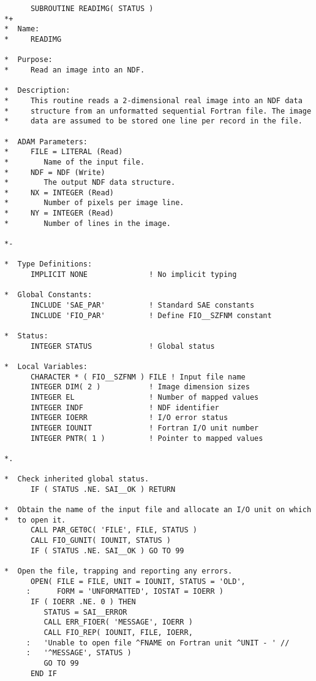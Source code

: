 \small
\begin{verbatim}
      SUBROUTINE READIMG( STATUS )
*+
*  Name:
*     READIMG

*  Purpose:
*     Read an image into an NDF.

*  Description:
*     This routine reads a 2-dimensional real image into an NDF data
*     structure from an unformatted sequential Fortran file. The image
*     data are assumed to be stored one line per record in the file.

*  ADAM Parameters:
*     FILE = LITERAL (Read)
*        Name of the input file.
*     NDF = NDF (Write)
*        The output NDF data structure.
*     NX = INTEGER (Read)
*        Number of pixels per image line.
*     NY = INTEGER (Read)
*        Number of lines in the image.

*-
      
*  Type Definitions:
      IMPLICIT NONE              ! No implicit typing

*  Global Constants:
      INCLUDE 'SAE_PAR'          ! Standard SAE constants
      INCLUDE 'FIO_PAR'          ! Define FIO__SZFNM constant

*  Status:
      INTEGER STATUS             ! Global status

*  Local Variables:
      CHARACTER * ( FIO__SZFNM ) FILE ! Input file name
      INTEGER DIM( 2 )           ! Image dimension sizes
      INTEGER EL                 ! Number of mapped values
      INTEGER INDF               ! NDF identifier
      INTEGER IOERR              ! I/O error status
      INTEGER IOUNIT             ! Fortran I/O unit number
      INTEGER PNTR( 1 )          ! Pointer to mapped values

*.

*  Check inherited global status.
      IF ( STATUS .NE. SAI__OK ) RETURN

*  Obtain the name of the input file and allocate an I/O unit on which
*  to open it.
      CALL PAR_GET0C( 'FILE', FILE, STATUS )
      CALL FIO_GUNIT( IOUNIT, STATUS )
      IF ( STATUS .NE. SAI__OK ) GO TO 99

*  Open the file, trapping and reporting any errors.
      OPEN( FILE = FILE, UNIT = IOUNIT, STATUS = 'OLD',
     :      FORM = 'UNFORMATTED', IOSTAT = IOERR )
      IF ( IOERR .NE. 0 ) THEN
         STATUS = SAI__ERROR
         CALL ERR_FIOER( 'MESSAGE', IOERR )
         CALL FIO_REP( IOUNIT, FILE, IOERR,
     :   'Unable to open file ^FNAME on Fortran unit ^UNIT - ' //
     :   '^MESSAGE', STATUS )
         GO TO 99
      END IF


\end{verbatim}
